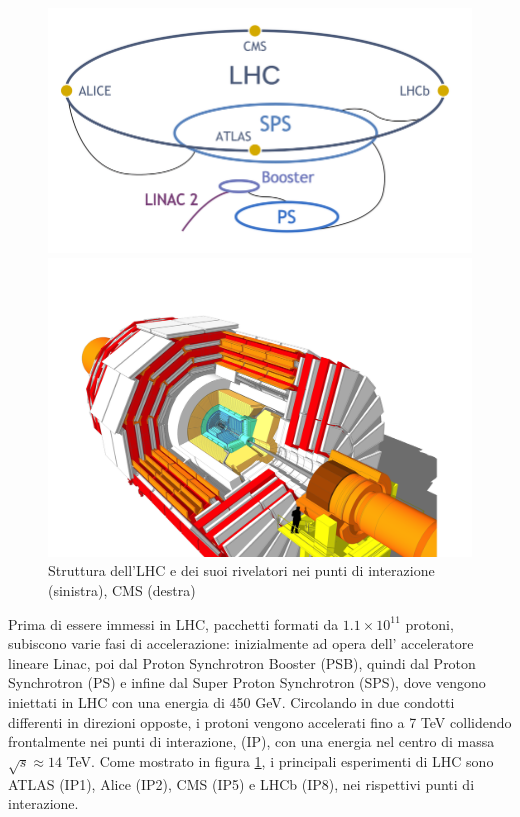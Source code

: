 \begin{figure}[t]
  \centering
  \begin{minipage}[b]{0.43\textwidth}
      \centering
      \includegraphics[width=\textwidth]{../ImmaginiTesi/LHC.png} 
  \end{minipage}
  \hfill 
  \begin{minipage}[b]{0.56\textwidth}
      \centering
      \includegraphics[width=\textwidth]{../ImmaginiTesi/CMS.png} 
  \end{minipage}
  \caption{Struttura dell'LHC e dei suoi rivelatori nei punti di interazione (sinistra), CMS (destra)}
  \label{fig:LHC-CMS}
\end{figure}


Prima di essere immessi in LHC, pacchetti formati da $1.1 \times 10^{11}$ protoni, subiscono varie fasi di accelerazione: inizialmente ad opera dell' acceleratore lineare Linac, poi dal Proton Synchrotron Booster (PSB), quindi dal Proton Synchrotron (PS) e infine dal Super Proton Synchrotron (SPS), dove vengono iniettati in LHC con una energia di 450 GeV. Circolando in due condotti differenti in direzioni opposte, i protoni vengono accelerati fino a 7 TeV collidendo frontalmente nei punti di interazione, (IP), con una energia nel centro di massa $\sqrt{s} \approx 14$ TeV. Come mostrato in figura \ref{fig:LHC-CMS}, i principali esperimenti di LHC sono ATLAS (IP1), Alice (IP2), CMS (IP5) e LHCb (IP8), nei rispettivi punti di interazione.


